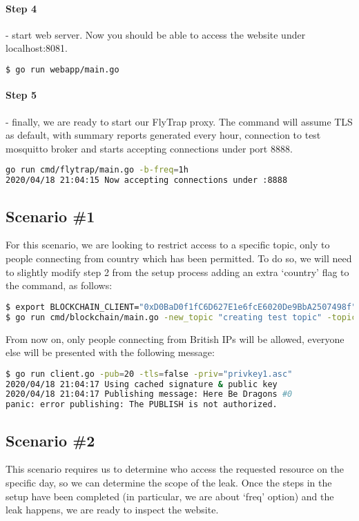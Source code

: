 \paragraph{Step 4} - start web server. Now you should be able to access the website under localhost:8081.
\begin{lstlisting}[language=bash,breaklines=true]
$ go run webapp/main.go
\end{lstlisting}
\paragraph{Step 5} - finally, we are ready to start our FlyTrap proxy. The command will assume TLS as default, with summary reports generated every hour, connection to test mosquitto broker and starts accepting connections under port 8888.
\begin{lstlisting}[language=bash,breaklines=true]
go run cmd/flytrap/main.go -b-freq=1h
2020/04/18 21:04:15 Now accepting connections under :8888
\end{lstlisting}
\subsection{Scenario \#1}
For this scenario, we are looking to restrict access to a specific topic, only to people connecting from country which has been permitted. To do so, we will need to slightly modify step 2 from the setup process adding an extra `country' flag to the command, as follows:
\begin{lstlisting}[language=bash,breaklines=true]
$ export BLOCKCHAIN_CLIENT="0xD0BaD0f1fC6D627E1e6fcE6020De9BbA2507498f"
$ go run cmd/blockchain/main.go -new_topic "creating test topic" -topic "RestrictedTopic" -country="GB"
\end{lstlisting}
From now on, only people connecting from British IPs will be allowed, everyone else will be presented with the following message:
\begin{lstlisting}[language=bash,breaklines=true]
$ go run client.go -pub=20 -tls=false -priv="privkey1.asc"
2020/04/18 21:04:17 Using cached signature & public key
2020/04/18 21:04:17 Publishing message: Here Be Dragons #0
panic: error publishing: The PUBLISH is not authorized.
\end{lstlisting}
\subsection{Scenario \#2}
This scenario requires us to determine who access the requested resource on the specific day, so we can determine the scope of the leak. Once the steps in the setup have been completed (in particular, we are about `freq' option) and the leak happens, we are ready to inspect the website.

